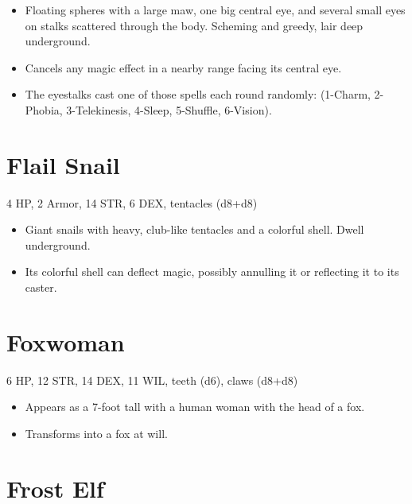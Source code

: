 \documentclass[
  10pt,
  american,
]{article}
\begin{document}
\begin{samepage}
\begin{itemize}
\setlength\itemsep{-.5em}
\item Floating spheres with a large maw, one big central eye, and several small eyes on stalks scattered through the body.   Scheming and greedy, lair deep underground.
\item Cancels any magic effect in a nearby range facing its central eye.
\item The eyestalks cast one of those spells each round randomly: (1-Charm, 2-Phobia, 3-Telekinesis, 4-Sleep, 5-Shuffle, 6-Vision).
\end{itemize}
\end{samepage}

\hypertarget{flail-snail}{%
\section{Flail Snail}\label{flail-snail}}

4 HP, 2 Armor, 14 STR, 6 DEX, tentacles (d8+d8)

\begin{samepage}
\begin{itemize}
\setlength\itemsep{-.5em}
\item Giant snails with heavy, club-like tentacles and a colorful shell.   Dwell underground.
\item Its colorful shell can deflect magic, possibly annulling it or reflecting it to its caster.
\end{itemize}
\end{samepage}

\hypertarget{foxwoman}{%
\section{Foxwoman}\label{foxwoman}}

6 HP, 12 STR, 14 DEX, 11 WIL, teeth (d6), claws (d8+d8)

\begin{samepage}
\begin{itemize}
\setlength\itemsep{-.5em}
\item Appears as a 7-foot tall with a human woman with the head of a fox.
\item Transforms into a fox at will.
\end{itemize}
\end{samepage}

\hypertarget{frost-elf}{%
\section{Frost Elf}\label{frost-elf}}
\end{document}
